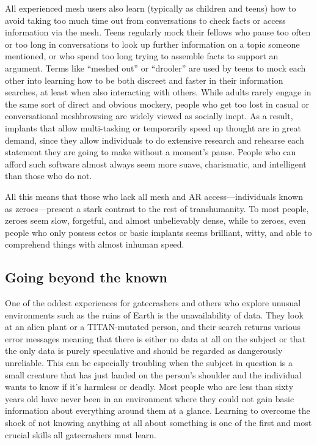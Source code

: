 All experienced mesh users also learn (typically as children and
teens) how to avoid taking too much time out from conversations to
check facts or access information via the mesh. Teens regularly mock
their fellows who pause too often or too long in conversations to look
up further information on a topic someone mentioned, or who spend too
long trying to assemble facts to support an argument. Terms like
“meshed out” or “drooler” are used by teens to mock each other into
learning how to be both discreet and faster in their information
searches, at least when also interacting with others. While adults
rarely engage in the same sort of direct and obvious mockery, people
who get too lost in casual or conversational meshbrowsing are widely
viewed as socially inept. As a result, implants that allow
multi-tasking or temporarily speed up thought are in great demand,
since they allow individuals to do extensive research and rehearse
each statement they are going to make without a moment's pause. People
who can afford such software almost always seem more suave,
charismatic, and intelligent than those who do not.

All this means that those who lack all mesh and AR access—individuals
known as zeroes—present a stark contrast to the rest of
transhumanity. To most people, zeroes seem slow, forgetful, and almost
unbelievably dense, while to zeroes, even people who only possess
ectos or basic implants seems brilliant, witty, and able to comprehend
things with almost inhuman speed.

\subsection{Going beyond the known}
\label{sec:going-beyond-known}

One of the oddest experiences for gatecrashers and others who explore
unusual environments such as the ruins of Earth is the unavailability
of data. They look at an alien plant or a TITAN-mutated person, and
their search returns various error messages meaning that there is
either no data at all on the subject or that the only data is purely
speculative and should be regarded as dangerously unreliable. This can
be especially troubling when the subject in question is a small
creature that has just landed on the person's shoulder and the
individual wants to know if it's harmless or deadly. Most people who
are less than sixty years old have never been in an environment where
they could not gain basic information about everything around them at
a glance. Learning to overcome the shock of not knowing anything at
all about something is one of the first and most crucial skills all
gatecrashers must learn.

